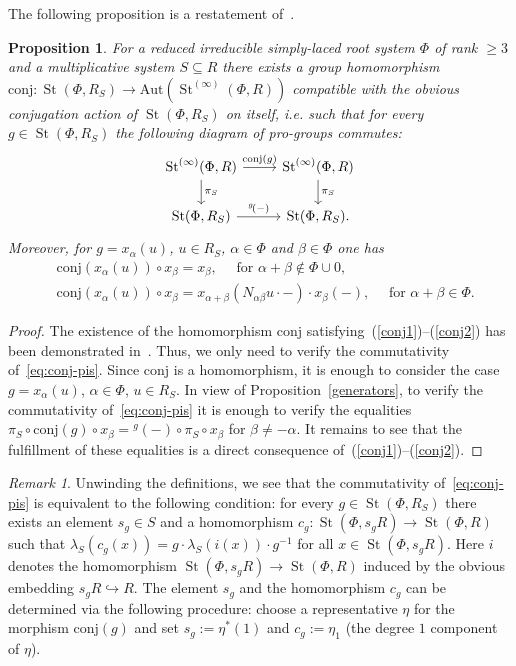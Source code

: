 \documentclass[oneside, 11pt]{amsart}
\numberwithin{equation}{section}
\newtheorem{proposition}[lemma]{Proposition}
\newcommand{\St}{\mathop{\mathrm{St}}\nolimits}
\theoremstyle{definition}
\theoremstyle{definition}
\theoremstyle{remark}
\newtheorem{rem}[lemma]{Remark}
\begin{document}
 The following proposition is a restatement of~\cite[Proposition~4.3]{LSV20}.
\begin{proposition}\label{prop:conj-action}
 For a reduced irreducible simply-laced root system $\Phi$ of rank $\geq 3$ and a multiplicative system $S\subseteq R$ there exists a group homomorphism $\mathrm{conj}\colon \St(\Phi, R_S) \to \mathrm{Aut}(\St^{(\infty)}(\Phi, R))$ compatible with the obvious conjugation action of $\St(\Phi, R_S)$ on itself, i.e. such that for every $g \in \St(\Phi, R_S)$ the following diagram of pro-groups commutes:
 \begin{equation} \label{eq:conj-pis} \begin{tikzcd} \St^{(\infty)}(\Phi, R) \ar{r}{\mathrm{conj}(g)} \ar{d}{\pi_S} & \St^{(\infty)}(\Phi, R) \ar{d}{\pi_S} \\ \St(\Phi, R_S) \ar{r}{{}^g\!(-)} & \St(\Phi, R_S). \end{tikzcd} \end{equation}
 Moreover, for $g=x_\alpha(u)$, $u\in R_S$, $\alpha\in\Phi$ and $\beta\in\Phi$ one has
 \begin{align}
 \label{conj1}
&\mathrm{conj}(x_\alpha(u)) \circ x_\beta =x_\beta,\quad\text{ for }\alpha+\beta\not\in\Phi\cup0,\\
 \label{conj2}
&\mathrm{conj}(x_\alpha(u)) \circ x_\beta =x_{\alpha+\beta}(N_{\alpha\beta}u\cdot-)\cdot x_\beta(-),\quad\text{ for }\alpha+\beta\in\Phi.
 \end{align}
\end{proposition}
\begin{proof}
The existence of the homomorphism $\mathrm{conj}$ satisfying~(\ref{conj1})--(\ref{conj2}) has been demonstrated in~\cite[Lemma~4.2, Proposition~4.3]{LSV20}.
Thus, we only need to verify the commutativity of~\eqref{eq:conj-pis}. 
Since $\mathrm{conj}$ is a homomorphism, it is enough to consider the case $g = x_\alpha(u)$, $\alpha \in \Phi$, $u \in R_S$. In view of Proposition~\ref{generators}, to verify the commutativity of~\eqref{eq:conj-pis} it is enough to verify the equalities $\pi_S \circ \mathrm{conj}(g) \circ x_\beta= {}^g\!(-) \circ \pi_S \circ x_\beta$ for $\beta\neq -\alpha$.
 It remains to see that the fulfillment of these equalities is a direct consequence of~(\ref{conj1})--(\ref{conj2}). 
 \end{proof}
\begin{rem} \label{rem:conj-action}
Unwinding the definitions, we see that the commutativity of~\eqref{eq:conj-pis} is equivalent to the following condition: for every $g\in \St(\Phi, R_S)$ there exists an element $s_g\in S$ and a homomorphism $c_g \colon \St(\Phi, s_g R) \to \St(\Phi, R)$ such that $\lambda_S(c_g(x)) = g \cdot \lambda_S(i(x))\cdot g^{-1}$ for all $x\in \St(\Phi, s_g R)$. Here $i$ denotes the homomorphism $\St(\Phi, s_g R) \to \St(\Phi, R)$ induced by the obvious embedding $s_gR \hookrightarrow R$. The element $s_g$ and the homomorphism $c_g$ can be determined via the following procedure: choose a representative $\eta$ for the morphism $\mathrm{conj}(g)$ and set $s_g := \eta^*(1)$ and $c_g := \eta_1$ (the degree $1$ component of $\eta$).
\end{rem}
\end{document}
